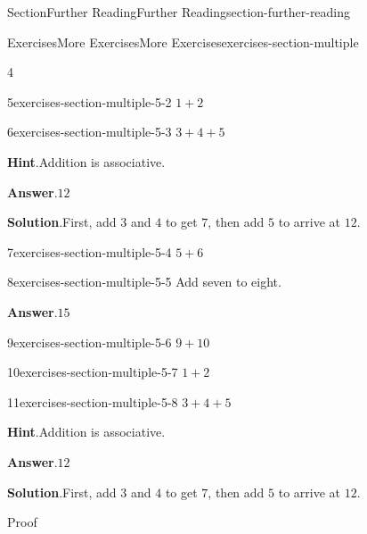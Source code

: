 \documentclass[twoside,10pt,]{article}
\newcommand{\blocktitlefont}{\relax}
\numberwithin{equation}{section}
\begin{document}
\begin{sectionptx}{Section}{Further Reading}{}{Further Reading}{}{}{section-further-reading}
\begin{exercises-subsection}{Exercises}{More Exercises}{}{More Exercises}{}{}{exercises-section-multiple}
\begin{exercisegroupcol}{4}
\begin{divisionexerciseegcol}{5}{}{}{exercises-section-multiple-5-2}%
\(1+2\)%
\end{divisionexerciseegcol}%
\begin{divisionexerciseegcol}{6}{}{}{exercises-section-multiple-5-3}%
\(3+4+5\)%
\par\smallskip%
\noindent\textbf{\blocktitlefont Hint}.\hypertarget{exercises-section-multiple-5-3-2}{}\quad{}Addition is associative.%
\par\smallskip%
\noindent\textbf{\blocktitlefont Answer}.\hypertarget{exercises-section-multiple-5-3-3}{}\quad{}\(12\)%
\par\smallskip%
\noindent\textbf{\blocktitlefont Solution}.\hypertarget{exercises-section-multiple-5-3-4}{}\quad{}First, add \(3\) and \(4\) to get \(7\), then add \(5\) to arrive at \(12\).%
\end{divisionexerciseegcol}%
\begin{divisionexerciseegcol}{7}{}{}{exercises-section-multiple-5-4}%
\(5+6\)%
\end{divisionexerciseegcol}%
\begin{divisionexerciseegcol}{8}{}{}{exercises-section-multiple-5-5}%
Add seven to eight.%
\par\smallskip%
\noindent\textbf{\blocktitlefont Answer}.\hypertarget{exercises-section-multiple-5-5-2}{}\quad{}\(15\)%
\end{divisionexerciseegcol}%
\begin{divisionexerciseegcol}{9}{}{}{exercises-section-multiple-5-6}%
\(9+10\)%
\end{divisionexerciseegcol}%
\begin{divisionexerciseegcol}{10}{}{}{exercises-section-multiple-5-7}%
\(1+2\)%
\end{divisionexerciseegcol}%
\begin{divisionexerciseegcol}{11}{}{}{exercises-section-multiple-5-8}%
\(3+4+5\)%
\par\smallskip%
\noindent\textbf{\blocktitlefont Hint}.\hypertarget{exercises-section-multiple-5-8-2}{}\quad{}Addition is associative.%
\par\smallskip%
\noindent\textbf{\blocktitlefont Answer}.\hypertarget{exercises-section-multiple-5-8-3}{}\quad{}\(12\)%
\par\smallskip%
\noindent\textbf{\blocktitlefont Solution}.\hypertarget{exercises-section-multiple-5-8-4}{}\quad{}First, add \(3\) and \(4\) to get \(7\), then add \(5\) to arrive at \(12\).%
\begin{solutionproof}{Proof}

\end{solutionproof}
\end{divisionexerciseegcol}
\end{exercisegroupcol}
\end{exercises-subsection}
\end{sectionptx}
\end{document}
